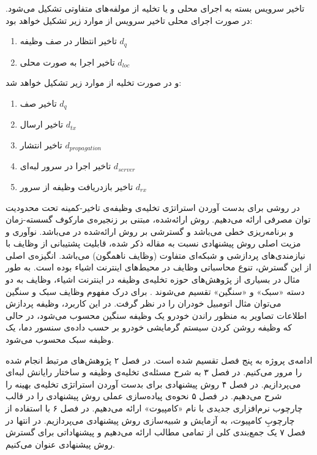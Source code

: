 تاخیر سرویس بسته به اجرای محلی و یا تخلیه از مولفه‌های متفاوتی تشکیل می‌شود. در صورت اجرای محلی تاخیر سرویس از موارد زیر تشکیل خواهد بود:
\begin{enumerate}
	\item تاخیر انتظار در صف وظیفه $d_q$
	\item تاخیر اجرا به صورت محلی $d_{l o c}$
\end{enumerate}
و در صورت تخلیه از موارد زیر تشکیل خواهد شد:
\begin{enumerate}
	\item تاخیر صف $d_q$
	\item تاخیر ارسال $d_{t x}$
	\item تاخیر انتشار $d_{p r o p a g a t i o n}$
	\item تاخیر اجرا در سرور لبه‌ای $d_{s e r v e r}$
	\item تاخیر بازدریافت وظیفه از سرور $d_{r x}$
\end{enumerate}
در \CurrentProject روشی برای بدست آوردن استراتژی تخلیه‌ی وظیفه‌ی تاخیر-کمینه تحت محدودیت توان مصرفی ارائه می‌دهیم. روش ارائه‌شده، مبتنی بر زنجیره‌ی مارکوف گسسته-زمان و برنامه‌ریزی خطی می‌باشد و گسترشی بر روش ارائه‌شده در \Cite{Liu} می‌باشد. نوآوری و مزیت اصلی روش پیشنهادی نسبت به مقاله ذکر شده،‌ قابلیت پشتیبانی از وظایف با نیازمندی‌های پردازشی و شبکه‌ای متفاوت (وظایف ناهمگون) می‌باشد. انگیزه‌ی اصلی از این گسترش، تنوع محاسباتی وظایف در محیط‌های اینترنت اشیاء بوده است. به طور مثال در بسیاری از پژوهش‌های حوزه تخلیه‌ی وظیفه در اینترنت اشیاء، وظایف به دو دسته «سبک» و «سنگین» تقسیم می‌شوند \Cite{yousefpour, tran}. برای درک مفهوم وظایف سبک و سنگین می‌توان مثال اتومبیل خودران را در نظر گرفت. در این کاربرد، وظیفه پردازش اطلاعات تصاویر به منظور راندن خودرو یک وظیفه سنگین محسوب می‌شود، در حالی که وظیفه‌ روشن کردن سیستم گرمایشی خودرو بر حسب داده‌ی سنسور دما، یک وظیفه سبک محسوب می‌شود.


ادامه‌ی پروژه به پنج فصل تقسیم شده است. در فصل ۲ پژوهش‌های مرتبط انجام شده را مرور می‌کنیم. در فصل ۳ به شرح مسئله‌ی تخلیه‌ی وظیفه و ساختار رایانش لبه‌ای می‌پردازیم. در فصل ۴ روش پیشنهادی برای بدست آوردن استراتژی تخلیه‌ی بهینه را شرح می‌دهیم. در فصل ۵ نحوه‌ی پیاده‌سازی عملی روش پیشنهادی را در قالب چارچوب نرم‌افزاری جدیدی با نام «کامپیوت» ارائه می‌دهیم. در فصل ۶ با استفاده از چارچوبِ کامپیوت، به آزمایش و شبیه‌سازی روش پیشنهادی می‌پردازیم. در انتها در فصل ۷ یک جمع‌بندی کلی از تمامی مطالب ارائه می‌دهیم و پیشنهاداتی برای گسترش روش پیشنهادی عنوان می‌کنیم.
\clearpage
